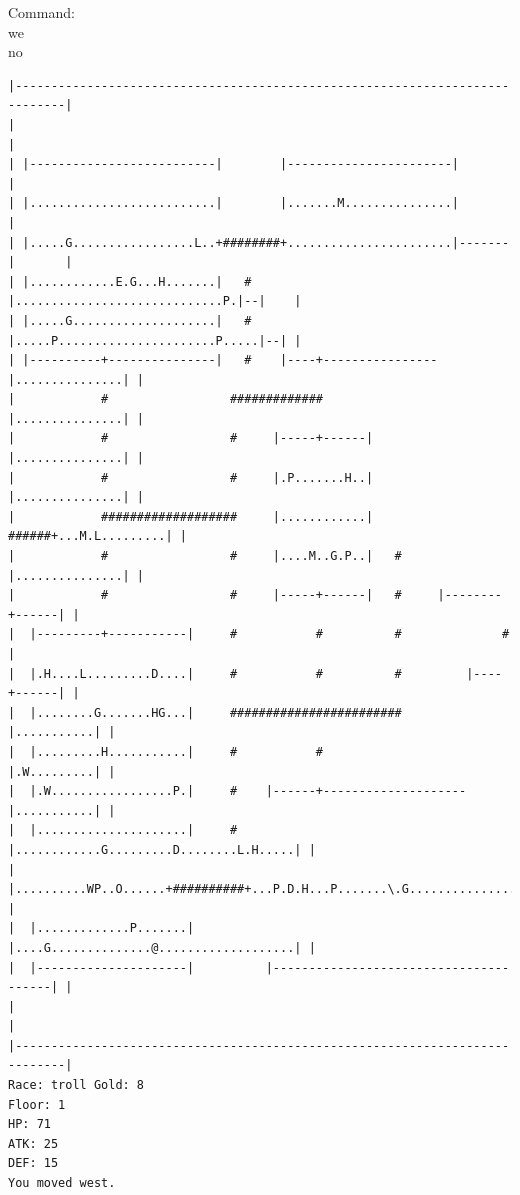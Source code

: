 \documentclass[11pt]{article}
\theoremstyle{plain}
\begin{document}
Command: \\
we\\
no
\begin{Verbatim}[fontsize=\scriptsize]
|-----------------------------------------------------------------------------|
|                                                                             |
| |--------------------------|        |-----------------------|               |
| |..........................|        |.......M...............|               |
| |.....G.................L..+########+.......................|-------|       |
| |............E.G...H.......|   #    |.............................P.|--|    |
| |.....G....................|   #    |.....P......................P.....|--| |
| |----------+---------------|   #    |----+----------------|...............| |
|            #                 #############                |...............| |
|            #                 #     |-----+------|         |...............| |
|            #                 #     |.P.......H..|         |...............| |
|            ###################     |............|   ######+...M.L.........| |
|            #                 #     |....M..G.P..|   #     |...............| |
|            #                 #     |-----+------|   #     |--------+------| |
|  |---------+-----------|     #           #          #              #        |
|  |.H....L.........D....|     #           #          #         |----+------| |
|  |........G.......HG...|     ########################         |...........| |
|  |.........H...........|     #           #                    |.W.........| |
|  |.W.................P.|     #    |------+--------------------|...........| |
|  |.....................|     #    |............G.........D........L.H.....| |
|  |..........WP..O......+##########+...P.D.H...P.......\.G.................| |
|  |.............P.......|          |....G..............@...................| |
|  |---------------------|          |---------------------------------------| |
|                                                                             |
|-----------------------------------------------------------------------------|
Race: troll Gold: 8                                                    Floor: 1
HP: 71
ATK: 25
DEF: 15
You moved west. 


\end{Verbatim}
\end{document}
